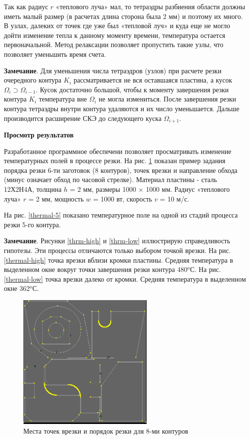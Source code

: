\documentclass{article}
\begin{document}
Так как радиус  $r$
«теплового луча» мал,
то тетраэдры разбиения области должны иметь малый размер
(в расчетах длина сторона была  2 мм)
и поэтому их много.
В узлах, далеких от точек где уже был «тепловой луч»
и куда еще не могло дойти изменение тепла к данному моменту времени,
температура остается первоначальной.
Метод релаксации позволяет пропустить такие узлы,
что позволяет уменьшить время счета.

{\bf Замечание}.
Для уменьшения числа тетраэдров (узлов)
при расчете резки очередного контура
$K_i$
рассматривается не вся оставшаяся пластина, а кусок
$\Omega_i \supset \Omega_{i-1}$.
Кусок  достаточно большой,
чтобы к моменту завершения резки контура
$K_i$
температура вне
$\Omega_i$
не могла измениться.
После завершения резки контура
тетраэдры внутри контура удаляются и их число уменьшается.
Дальше производится расширение СКЭ до следующего куска
$\Omega_{i+1}$.

{\bf Просмотр результатов}

Разработанное программное обеспечени
позволяет просматривать изменение температурных полей
в процессе резки.
На рис. \ref{thermal-plan}
показан пример задания порядка резки
6-ти заготовок (8 контуров),
точек врезки и направление обхода
(минус означает обход по часовой стрелке).
Материал пластины -  сталь 12Х2Н4А,
толщина $h$ = 2 мм, размеры 1000 $\times$ 1000 мм.
Радиус «теплового луча» $r$ = 2 мм,
мощность $w$ = 1000 вт,
скорость $v$ = 10 м/с.

На рис. \ref{thermal-5} показано температурное поле
на одной из стадий процесса резки 5-го контура.

{\bf Замечание}.
Рисунки \ref{thrm-high} и \ref{thrm-low}  иллюстрирую справедливость гипотезы.
Эти процессы отличаются только выбором точкой врезки.
На рис. \ref{thermal-high} точка врезки вблизи кромки пластины.
Средняя температура в выделенном окне
вокруг точки завершения резки контура 480$^o$С.
На рис. \ref{thermal-low} точка врезки далеко от кромки.
Средняя температура в выделенном окне  362$^o$С.

\begin{figure}
  \centering
  \includegraphics[width=0.6\textwidth]{thermal-plan.png}
  \caption{Места точек врезки и порядок резки для 8-ми контуров}
  \label{thermal-plan}
\end{figure}
\end{document}
